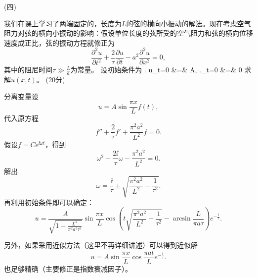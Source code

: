 \documentclass[12pt,CJK]{article}
\begin{document}
\item[(四)]{ 我们在课上学习了两端固定的，长度为$L$的弦的横向小振动的解法。现在考虑空气阻力对弦的横向小振动的影响：假设单位长度的弦所受的空气阻力和弦的横向位移速度成正比，弦的振动方程就修正为
  $$ \frac{\partial^2 u}{\partial t^2} + \frac{2}{\tau} \frac{\partial u}{\partial t}-  a^2\frac{\partial^2u }{\partial x^2} =  0 , $$
  其中的阻尼时间$\tau \gg \frac{L}{a}$为常量。
  设初始条件为
  \bea
  \left. u\right\vert_{t=0} &=& A, \newl
  \left.\right\vert_{t=0} &=& 0
  \eea
  求解$u(x,t)$。 (20分)


  {\blue
    分离变量设$$ u = A\sin{\frac{\pi x}{L}} f(t),$$代入原方程
    $$ f''+\frac{2}{\tau}f'+ \frac{\pi^2a^2}{L^2}f = 0 .$$
    假设$f = C e^{\ii \omega t}$，得到
    $$ \omega^2 - \frac{2\ii}{\tau}\omega - \frac{\pi^2a^2}{L^2} = 0. $$
    解出
    $$\omega = \frac{\ii}{\tau} \pm \sqrt{\frac{\pi^2a^2}{L^2} -\frac{1}{\tau^2}}. $$
    再利用初始条件即可以确定：
    $$ u = \frac{A}{\sqrt{1-\frac{L^2}{\pi^2a^2\tau^2}}}\sin\frac{\pi x}{L}  \cos{\left(t \sqrt{\frac{\pi^2 a^2}{L^2}-\frac{1}{\tau^2}}-\arcsin\frac{L}{\pi a\tau}\right)} e^{-\frac{t}{\tau}}.$$

    \skiplines
    

    另外，如果采用近似方法（这里不再详细讲述）可以得到近似解 $$ u= A\sin\frac{\pi x}{L}  \cos\frac{\pi at}{L} e^{-\frac{t}{\tau}}.$$
    也足够精确（主要修正是指数衰减因子）。


  }

}

  
\eitem  





\ech
\end{document}
